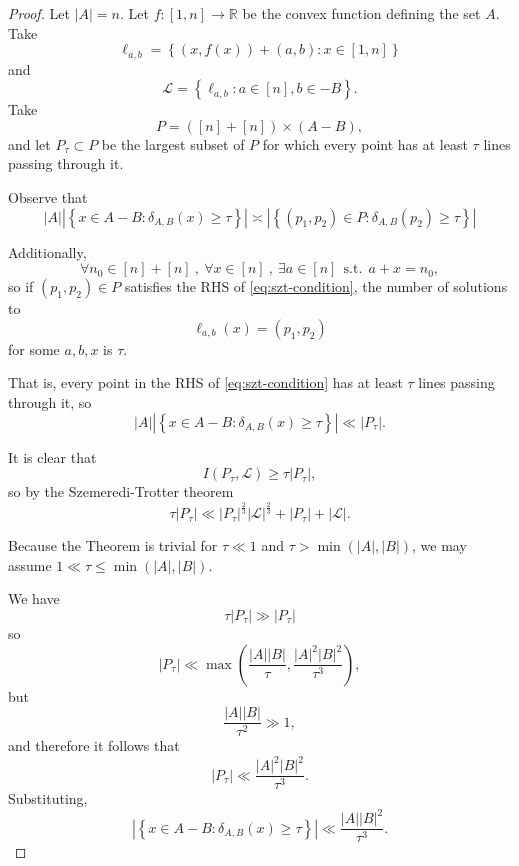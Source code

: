 \documentclass[12pt,reqno]{amsart}
\begin{document}
\begin{proof}
Let \(\left\lvert A \right\rvert  = n\). Let \(f: [1,n] \to \mathbb{R} \) be the convex
function defining the set \(A\). Take
\[
    \ell _{a,b} = \left\{ \left( x,f(x) \right) + (a,b) : x \in [1,n] \right\} 
\]
and
\[
    \mathcal{L} = \left\{ \ell _{a,b} : a \in [n] , b \in -B \right\} 
.\]
Take
\[
    P = \left( [n] + [n]  \right) \times \left( A - B \right) 
,\]
and let \(P_{\tau}  \subset P\) be the largest subset of \(P\) for which every
point has at least \(\tau\) lines passing through it. 

Observe that 
\begin{equation} \label{eq:szt-condition}
    \left\lvert A \right\rvert  \left\lvert  \left\{ x \in A -B : \delta_{A,B} (x) \geq \tau \right\}  \right\rvert \asymp  \left\lvert \left\{ (p_1,p_2) \in P : \delta_{A,B} (p_2)\geq \tau   \right\}  \right\rvert 
\end{equation}

Additionally,
\[
    \forall n_0 \in [n]+[n]~,~  \forall x \in [n]~,~  \exists a \in [n] ~~\text{s.t.}~~ a + x = n_0
,\]
so if \(\left( p_1,p_2 \right) \in P\) satisfies the RHS of \ref{eq:szt-condition},
the number of solutions to
\[
    \ell _{a,b} (x) = \left( p_1,p_2 \right) 
\]
for some \(a,b,x\) is \(\tau\).

That is, every point in the RHS of \ref{eq:szt-condition} has at least \(\tau\) lines
passing through it, so
\[
    \left\lvert A \right\rvert \left\lvert \left\{ x \in A - B : \delta_{A,B} (x) \geq \tau \right\}  \right\rvert \ll \left\lvert P_{\tau}  \right\rvert 
.\]

It is clear that
\[
    I(P_{\tau} , \mathcal{L} ) \geq \tau \left\lvert P_{\tau}  \right\rvert 
,\]
so by the Szemeredi-Trotter theorem
\[
    \tau\left\lvert P_{\tau}  \right\rvert \ll \left\lvert P_{\tau}  \right\rvert ^{\frac{2}{3} } \left\lvert \mathcal{L}  \right\rvert ^{\frac{2}{3} } + \left\lvert P_{\tau}  \right\rvert + \left\lvert \mathcal{L}  \right\rvert
.\]

Because the Theorem is trivial for \(\tau \ll 1\) and \(\tau > \min \left( \left\lvert A \right\rvert ,\left\lvert B \right\rvert  \right) \),
we may assume \(1 \ll \tau \leq \min \left( \left\lvert A \right\rvert , \left\lvert B \right\rvert  \right) \).

We have
\[
    \tau \left\lvert P_{\tau}  \right\rvert \gg \left\lvert P _{\tau}  \right\rvert 
\]
so
\[
    \left\lvert P _{\tau}  \right\rvert \ll \max \left( \frac{\left\lvert A \right\rvert \left\lvert B \right\rvert }{\tau} , \frac{\left\lvert A \right\rvert ^{2}\left\lvert B \right\rvert ^{2}}{\tau ^{3} }  \right)
,\]
but
\[
    \frac{\left\lvert A \right\rvert \left\lvert B \right\rvert }{\tau ^{2}} \gg 1
,\]
and therefore it follows that
\[
    \left\lvert P_{\tau}  \right\rvert \ll \frac{\left\lvert A \right\rvert ^{2} \left\lvert B \right\rvert ^{2} }{\tau^{3} } 
.\]
Substituting,
\[
    \left\lvert  \left\{ x \in A -B : \delta_{A,B} (x) \geq \tau \right\}  \right\rvert \ll \frac{\left\lvert A \right\rvert \left\lvert B \right\rvert ^{2} }{\tau^{3} } 
.\]
\end{proof}
\end{document}
